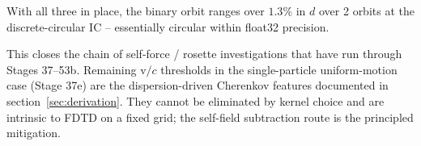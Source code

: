 \documentclass[11pt,a4paper]{article}
\begin{document}
With all three in place, the binary orbit ranges over $1.3\%$ in $d$
over 2 orbits at the discrete-circular IC -- essentially circular
within float32 precision.

This closes the chain of self-force / rosette investigations that
have run through Stages 37--53b.  Remaining v$/c$ thresholds in the
single-particle uniform-motion case (Stage 37e) are the
dispersion-driven Cherenkov features documented in
section~\ref{sec:derivation}.  They cannot be eliminated by kernel
choice and are intrinsic to FDTD on a fixed grid; the self-field
subtraction route is the principled mitigation.
\end{document}
